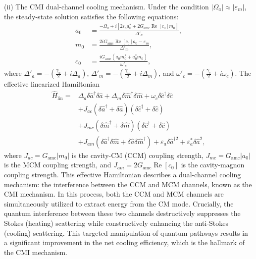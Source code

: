 \documentclass[aps, prresearch, reprint, nofootinbib, longbibliography]{revtex4-2}
\begin{document}
(ii) The CMI dual-channel cooling mechanism.  Under the condition \( |\Omega_a| \approx |\varepsilon_m| \),
the steady-state solution satisfies the following equations:
\begin{align}
a_0 &= \frac{-\Omega_a + i\left[ 2\varepsilon_a a^*_0 +  2G_{\mathrm{amc}}\operatorname{Re}[c_0]m_0\right]}{\Delta'_a}, \nonumber \\
m_0 &= \frac{  2iG_{\mathrm{amc}} \operatorname{Re}[c_0] a_0 - \varepsilon_m }{ \Delta'_m }, \nonumber \\
c_0 &= \frac{iG_{\text{amc}} (a_0 m_0^* + a_0^* m_0)}{\omega'_c}, \label{eq:steady_solutions_full}
\end{align}where \( \Delta'_a = -\left(\frac{\gamma_a}{2} + i\Delta_a\right) \), \( \Delta'_m = -\left(\frac{\gamma_m}{2} + i\Delta_m\right) \), and \( \omega'_c = -\left(\frac{\gamma_c}{2} + i\omega_c\right) \).
The effective linearized Hamiltonian
\begin{align}
	\hat{H}_{\mathrm{lin}} = &\Delta_a \delta \hat{a}^\dagger \delta \hat{a} + \Delta_m \delta \hat{m}^\dagger \delta \hat{m} + \omega_c \delta \hat{c}^\dagger \delta \hat{c} \nonumber \\
	& + J_{ac} (\delta \hat{a}^\dagger + \delta \hat{a}) (\delta \hat{c}^\dagger + \delta \hat{c}) \nonumber \\
	& + J_{mc} (\delta \hat{m}^\dagger + \delta \hat{m}) (\delta \hat{c}^\dagger + \delta \hat{c}) \nonumber \\
	& + J_{am} (\delta \hat{a}^\dagger \delta \hat{m} + \delta \hat{a} \delta \hat{m}^\dagger) + \varepsilon_a \delta \hat{a}^{\dagger 2} + \varepsilon_a^*\delta \hat{a}^2,
	\label{eqfull}
\end{align}
where \(  J_{ac}=G_\text{amc} |m_0| \) is the cavity-CM (CCM) coupling strength, \(  J_{mc}=G_\text{amc} |a_0| \)  is the MCM coupling strength, and \( J_{am}= 2G_\text{amc}\operatorname{Re}[c_0]  \) is the cavity-magnon coupling strength.
This effective Hamiltonian  describes a dual-channel cooling mechanism: the interference between the CCM and MCM channels, known as the CMI mechanism. In this process, both the CCM and MCM channels are simultaneously utilized to extract energy from the CM mode.
Crucially, the quantum interference between these two channels destructively suppresses the Stokes (heating) scattering while constructively enhancing the anti-Stokes (cooling) scattering. This targeted manipulation of quantum pathways results in a significant improvement in the net cooling efficiency, which is the hallmark of the CMI mechanism. 
\end{document}
